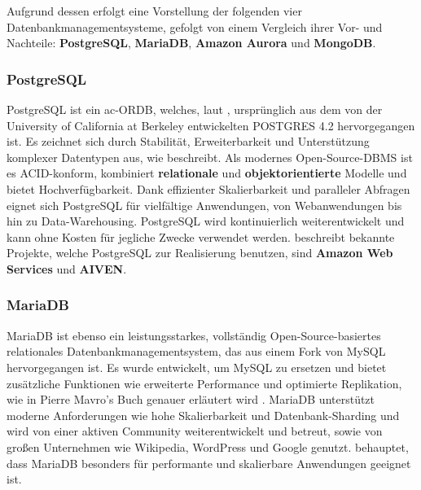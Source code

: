 \vspace{3mm} 
\noindent Aufgrund dessen erfolgt eine Vorstellung der folgenden vier Datenbankmanagementsysteme, gefolgt von einem Vergleich ihrer Vor- und Nachteile: \textbf{PostgreSQL}, \textbf{MariaDB}, \textbf{Amazon Aurora} und \textbf{MongoDB}.


\subsubsection{PostgreSQL}
PostgreSQL ist ein \gls{ac-ORDB}, welches, laut \cite{PostgreSQL:Hersteller}, ursprünglich aus dem von der University of California at Berkeley entwickelten POSTGRES 4.2 hervorgegangen ist. Es zeichnet sich durch Stabilität, Erweiterbarkeit und Unterstützung komplexer Datentypen aus, wie \cite{PostgreSQL:IBM} beschreibt. Als modernes \gls{Open-Source}-DBMS ist es ACID-konform, kombiniert \textbf{relationale} und \textbf{objektorientierte} Modelle und bietet Hochverfügbarkeit. Dank effizienter Skalierbarkeit und paralleler Abfragen eignet sich PostgreSQL für vielfältige Anwendungen, von Webanwendungen bis hin zu Data-Warehousing. PostgreSQL wird kontinuierlich weiterentwickelt und kann ohne \gls{Kosten} für jegliche Zwecke verwendet werden. \cite{PostgreSQL:Usage} beschreibt bekannte Projekte, welche PostgreSQL zur Realisierung benutzen, sind \textbf{Amazon Web Services} und \textbf{AIVEN}. 


\subsubsection{MariaDB}
MariaDB ist ebenso ein leistungsstarkes, vollständig Open-Source-basiertes relationales Datenbankmanagementsystem, das aus einem \gls{Fork} von MySQL hervorgegangen ist. Es wurde entwickelt, um MySQL zu ersetzen und bietet zusätzliche Funktionen wie erweiterte Performance und optimierte Replikation, wie in Pierre Mavro's Buch \cite{Buch:PierreMavro} genauer erläutert wird . MariaDB unterstützt moderne Anforderungen wie hohe Skalierbarkeit und \gls{Datenbank-Sharding} und wird von einer aktiven Community weiterentwickelt und betreut, sowie von großen Unternehmen wie Wikipedia, WordPress und Google genutzt. \cite{MariaDB:Intro} behauptet, dass MariaDB besonders für performante und skalierbare Anwendungen geeignet ist. 



\newpage
